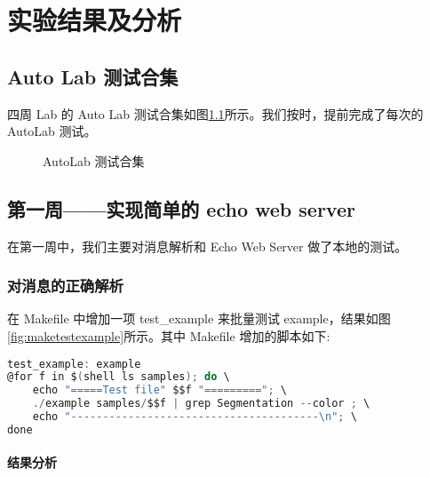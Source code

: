 \chapter{实验结果及分析}

\section{Auto Lab 测试合集}

四周 Lab 的 Auto Lab 测试合集如图\ref{fig:Autolabs}所示。我们按时，提前完成了每次的 AutoLab 测试。

\begin{figure}
    \centering
    \caption{AutoLab 测试合集}\label{fig:Autolabs}
\end{figure}

\section{第一周——实现简单的 echo web server}

在第一周中，我们主要对消息解析和 Echo Web Server 做了本地的测试。

\subsection{对消息的正确解析}

在 Makefile 中增加一项 test\_example 来批量测试 example，结果如图\ref{fig:maketestexample}所示。其中 Makefile 增加的脚本如下:

\begin{lstlisting}[language=C, name={Makefile: test example}]
test_example: example
@for f in $(shell ls samples); do \
	echo "=====Test file" $$f "========="; \
	./example samples/$$f | grep Segmentation --color ; \
	echo "---------------------------------------\n"; \
done
\end{lstlisting}

\subsubsection*{结果分析}

